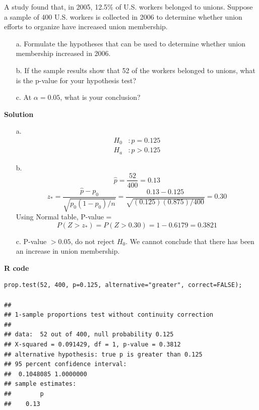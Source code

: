 \begin{example}
A study found that, in 2005, 12.5\% of U.S. workers belonged to unions. Suppose a sample of 400 U.S. workers is collected in 2006 to determine whether union efforts to organize have increased union membership.

\begin{itemize}
  \item[a.] Formulate the hypotheses that can be used to determine whether union membership increased in 2006.
  \item[b.] If the sample results show that 52 of the workers belonged to unions, what is the p-value for your hypothesis test?
  \item[c.] At $\alpha = 0.05$, what is your conclusion?
\end{itemize}

\vspace{1em}
\textbf{Solution}

\begin{itemize}
  \item[a.] 
  \begin{align*}
H_0 &: p = 0.125 \\
H_a &: p > 0.125
\end{align*}
  
  \item[b.] 
  \[
  \hat{p} = \frac{52}{400} = 0.13
  \]
  \[
  z_* = \frac{\hat{p} - p_0}{\sqrt{p_0(1 - p_0)/n}} = \frac{0.13 - 0.125}{\sqrt{(0.125)(0.875)/400}} = 0.30
  \]
  Using Normal table, P-value =
  \[
  P(Z > z_*) = P(Z > 0.30) = 1 - 0.6179 = 0.3821
  \]
  
  \item[c.] P-value $> 0.05$, do not reject $H_0$. We cannot conclude that there has been an increase in union membership.
\end{itemize}

\vspace{1em}
\noindent\textbf{R code}

\begin{tcolorbox}[colback=gray!10, colframe=black!45, arc=2mm]
\begin{verbatim}
prop.test(52, 400, p=0.125, alternative="greater", correct=FALSE);

##
## 1-sample proportions test without continuity correction
##
## data:  52 out of 400, null probability 0.125
## X-squared = 0.091429, df = 1, p-value = 0.3812
## alternative hypothesis: true p is greater than 0.125
## 95 percent confidence interval:
##  0.1048085 1.0000000
## sample estimates:
##        p 
##    0.13 
\end{verbatim}
\end{tcolorbox}
\end{example}

